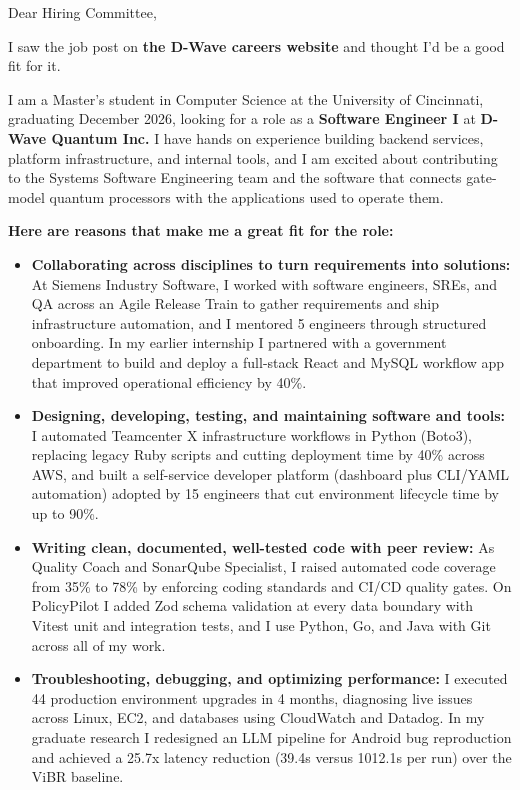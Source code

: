 \documentclass[11pt]{letter}
\date{}
\begin{document}
\begin{letter}{}

\opening{Dear Hiring Committee,}

I saw the job post on \textbf{the D-Wave careers website} and thought I'd be a good fit for it.

I am a Master's student in Computer Science at the University of Cincinnati, graduating December 2026, looking for a role as a \textbf{Software Engineer I} at \textbf{D-Wave Quantum Inc.} I have hands on experience building backend services, platform infrastructure, and internal tools, and I am excited about contributing to the Systems Software Engineering team and the software that connects gate-model quantum processors with the applications used to operate them.

\textbf{Here are reasons that make me a great fit for the role:}

\begin{itemize}[leftmargin=*, itemsep=0.45em]
    \item \textbf{Collaborating across disciplines to turn requirements into solutions:} At Siemens Industry Software, I worked with software engineers, SREs, and QA across an Agile Release Train to gather requirements and ship infrastructure automation, and I mentored 5 engineers through structured onboarding. In my earlier internship I partnered with a government department to build and deploy a full-stack React and MySQL workflow app that improved operational efficiency by 40\%.

    \item \textbf{Designing, developing, testing, and maintaining software and tools:} I automated Teamcenter X infrastructure workflows in Python (Boto3), replacing legacy Ruby scripts and cutting deployment time by 40\% across AWS, and built a self-service developer platform (dashboard plus CLI/YAML automation) adopted by 15 engineers that cut environment lifecycle time by up to 90\%.

    \item \textbf{Writing clean, documented, well-tested code with peer review:} As Quality Coach and SonarQube Specialist, I raised automated code coverage from 35\% to 78\% by enforcing coding standards and CI/CD quality gates. On PolicyPilot I added Zod schema validation at every data boundary with Vitest unit and integration tests, and I use Python, Go, and Java with Git across all of my work.

    \item \textbf{Troubleshooting, debugging, and optimizing performance:} I executed 44 production environment upgrades in 4 months, diagnosing live issues across Linux, EC2, and databases using CloudWatch and Datadog. In my graduate research I redesigned an LLM pipeline for Android bug reproduction and achieved a 25.7x latency reduction (39.4s versus 1012.1s per run) over the ViBR baseline.


\end{itemize}
\end{letter}
\end{document}
